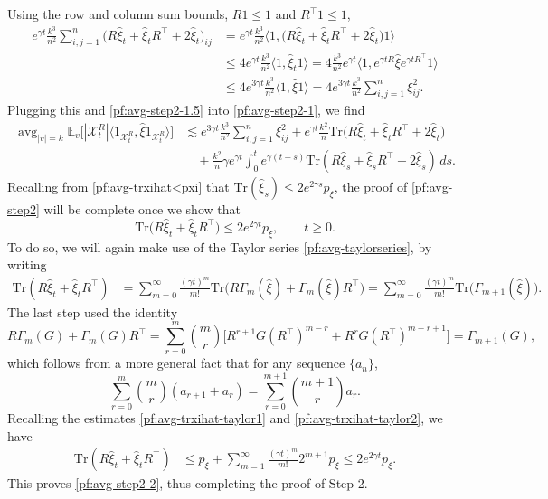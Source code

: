 \documentclass[11pt,reqno]{amsart}
\numberwithin{equation}{section}
\theoremstyle{definition}
\def\BB{{\Gamma}}
\def\E{{\mathbb E}}
\def\tr{{\mathrm{Tr}}}
\def\X{{\mathcal X}}
\DeclareMathOperator*{\avg}{avg}
\begin{document}
Using the row and column sum bounds, $R 1 \le 1$ and $R^\top 1 \le 1$,
\begin{align*}
e^{\gamma t}\frac{k^3}{n^2}\sum_{i,j=1}^n\Big(  R \widehat{\xi}_t +  \widehat{\xi}_tR ^\top +2 \widehat{\xi}_t\Big)_{ij} &= e^{\gamma t}\frac{k^3}{n^2}\Big\langle 1,\big(  R \widehat{\xi}_t +  \widehat{\xi}_tR^\top + 2\widehat{\xi}_t\big)1\Big\rangle \\
	&\le 4e^{\gamma t}\frac{k^3}{n^2} \big\langle 1,\widehat{\xi}_t1\big\rangle  = 4\frac{k^3}{n^2}  e^{\gamma t}\big\langle 1,e^{\gamma t R}\widehat{\xi} e^{\gamma t R^\top }1\big\rangle  \\
	&\le 4e^{3\gamma t}\frac{k^3}{n^2 }\langle 1, \widehat{\xi} 1\rangle  = 4 e^{3\gamma t}\frac{k^3}{n^2}  \sum_{i,j=1}^n\xi_{ij}^2.
\end{align*}
Plugging this and \eqref{pf:avg-step2-1.5} into \eqref{pf:avg-step2-1}, we find
\begin{align*}
\avg_{|v|=k}\E_v\big[ |\X_t^{R}| \langle 1_{\X_t^{R}}, \widehat{\xi} 1_{\X_t^{R}}\rangle  \big] &\lesssim e^{3\gamma t}\frac{k^3}{n^2} \sum_{i,j=1}^n\xi_{ij}^2 +  e^{\gamma t}\frac{k^2}{n}\tr\Big(  R \widehat{\xi}_t +  \widehat{\xi}_tR^\top + 2 \widehat{\xi}_t\Big) \\
	&\quad + \frac{k^2}{n}  \gamma e^{\gamma t} \int_0^t   e^{\gamma (t-s)  } \tr(R \widehat{\xi}_s + \widehat{\xi}_s R^\top + 2 \widehat{\xi}_s)  \,ds.
\end{align*}
Recalling from \eqref{pf:avg-trxihat<pxi} that $\tr(\widehat{\xi}_s) \le 2e^{2\gamma s}p_\xi$, 
the proof of \eqref{pf:avg-step2} will be complete once we show that
\begin{equation}
\tr\Big(  R \widehat{\xi}_t +  \widehat{\xi}_tR^\top  \Big) \le 2 e^{2\gamma t}p_\xi, \qquad t \ge 0. \label{pf:avg-step2-2}
\end{equation} 
To do so, we will again make use of the Taylor series \eqref{pf:avg-taylorseries}, by writing
\begin{align*}
\tr(R \widehat{\xi}_t + \widehat{\xi}_tR^\top) &=   \sum_{m=0}^\infty \frac{(\gamma t)^m}{m!} \tr \big(R\Gamma_m(\widehat{\xi}) + \Gamma_m(\widehat{\xi})R^\top\big) = \sum_{m=0}^\infty \frac{(\gamma t)^m}{m!} \tr \big(  \Gamma_{m+1}(\widehat{\xi})\big).
\end{align*}
The last step used the identity
\begin{equation*}  
	R \BB_m(G) + \BB_m(G)R^\top = \sum_{r=0}^m {m \choose r}\Big[ R^{r+1}G(R^\top)^{m-r} + R^{r}G(R^\top)^{m-r+1}\Big] = \BB_{m+1}(G),
\end{equation*}
which follows from a more general fact that for any sequence $\{a_n\}$,
\begin{equation*} 
	\sum_{r=0}^m \binom{m}{r} (a_{r+1} + a_r )
	 = \sum_{r=0}^{m+1}\binom{m+1}{r} a_r.
\end{equation*}
 Recalling the estimates \eqref{pf:avg-trxihat-taylor1} and \eqref{pf:avg-trxihat-taylor2}, we have
\begin{align*}
\tr( R \widehat{\xi}_t + \widehat{\xi}_t R^\top)  &\le  p_\xi + \sum_{m=1}^\infty \frac{(\gamma t)^m}{m!}2^{m +1}   p_\xi \le 2 e^{2\gamma t}p_\xi.
\end{align*}
This proves \eqref{pf:avg-step2-2}, thus completing the proof of Step 2.
\end{document}
